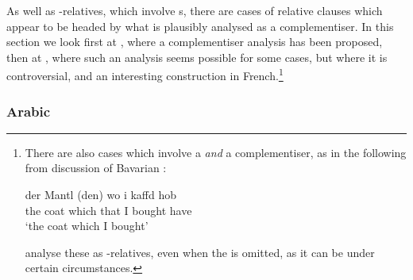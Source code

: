 \documentclass[output=paper
                ,modfonts
                ,nonflat
	        ,collection
	        ,collectionchapter
	        ,collectiontoclongg
 	        ,biblatex
                ,babelshorthands
                ,newtxmath
                ,draftmode
                ,colorlinks, citecolor=brown
]{./langsci/langscibook}
\begin{document}
As well as -relatives, which involve s, there are cases of relative clauses
which appear to be headed by what is plausibly analysed as a complementiser. In this
section we look first at , where a complementiser analysis has been proposed, 
then at , where such an analysis seems possible for some cases, but where it is
controversial, and an interesting construction in French.\footnote{There are also cases which involve a  \emph{and} a
  complementiser, as in the following from  discussion of Bavarian :
  \begin{exe}
    \ex \gll der Mantl (den) wo i kaffd hob\\
    the coat which that I bought have\\
    \glt `the coat which I bought’
  \end{exe}
  \cite{Hinrichs:Nakazawa:02} analyse these as -relatives, even when
  the  is omitted, as it can be under certain circumstances. 
}

\subsubsection{Arabic}
\label{sec:rc-arabic}
\end{document}
